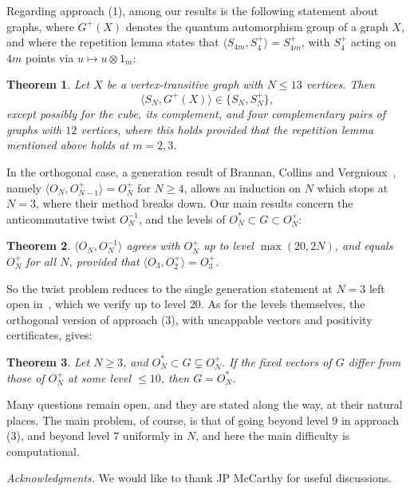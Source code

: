 \documentclass[11pt]{amsart}
\theoremstyle{definition}
\theoremstyle{remark}
\theoremstyle{plain}
\newtheorem{introtheorem}{Theorem}
\numberwithin{equation}{section}
\numberwithin{table}{section}
\begin{document}
Regarding approach (1), among our results is the following statement about graphs, where $G^+(X)$ denotes the quantum automorphism group of a graph $X$, and where the repetition lemma states that $\langle S_{4m},S_4^+\rangle=S_{4m}^+$, with $S_4^+$ acting on $4m$ points via $u\mapsto u\otimes1_m$:

\begin{introtheorem}
Let $X$ be a vertex-transitive graph with $N\le13$ vertices. Then
\[
\langle S_N,G^+(X)\rangle\in\{S_N,S_N^+\},
\]
except possibly for the cube, its complement, and four complementary pairs of graphs with $12$ vertices, where this holds provided that the repetition lemma mentioned above holds at $m=2,3$.
\end{introtheorem}

In the orthogonal case, a generation result of Brannan, Collins and Vergnioux~\cite{bcv}, namely $\langle O_N,O_{N-1}^+\rangle=O_N^+$ for $N\ge4$, allows an induction on $N$ which stops at $N=3$, where their method breaks down. Our main results concern the anticommutative twist $O_N^{-1}$, and the levels of $O_N^*\subset G\subset O_N^+$:

\begin{introtheorem}
$\langle O_N,O_N^{-1}\rangle$ agrees with $O_N^+$ up to level $\max(20,2N)$, and equals $O_N^+$ for all $N$, provided that $\langle O_3,O_2^+\rangle=O_3^+$.
\end{introtheorem}

So the twist problem reduces to the single generation statement at $N=3$ left open in~\cite{bcv}, which we verify up to level $20$. As for the levels themselves, the orthogonal version of approach (3), with uncappable vectors and positivity certificates, gives:

\begin{introtheorem}
Let $N\ge3$, and $O_N^*\subset G\subsetneq O_N^+$. If the fixed vectors of $G$ differ from those of $O_N^+$ at some level $\le10$, then $G=O_N^*$.
\end{introtheorem}

Many questions remain open, and they are stated along the way, at their natural places. The main problem, of course, is that of going beyond level $9$ in approach (3), and beyond level $7$ uniformly in $N$, and here the main difficulty is computational.

\smallskip
\noindent\emph{Acknowledgments.} We would like to thank JP McCarthy for useful discussions.


\end{document}

